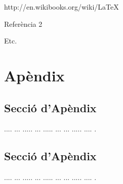 ﻿\documentclass[10pt,a4paper,twocolumn,twoside]{article}
\begin{document}
\begin{thebibliography}{11}
http://en.wikibooks.org/wiki/LaTeX

Referència 2

Etc.

\end{thebibliography}

\appendix

\section*{Apèndix}

\setcounter{section}{1}

\subsection{Secció d'Apèndix}
.... ... ..... ... ..... ... ... ..... .... .

\subsection{Secció d'Apèndix}
.... ... ..... ... ..... ... ... ..... .... .
\end{document}
